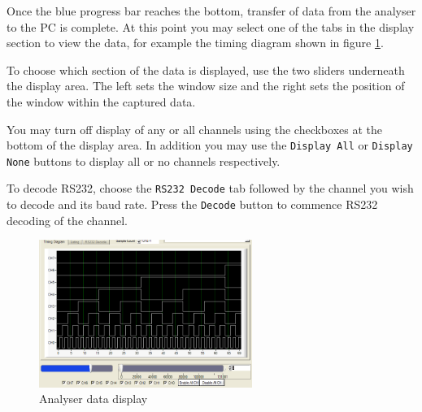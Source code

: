 \documentclass[11pt,twocolumn]{article}
\begin{document}
    Once the blue progress bar reaches the bottom, transfer of data from the
    analyser to the PC is complete. At this point you may select one of the
    tabs in the display section to view the data, for example the timing
    diagram shown in figure \ref{fig:ui-timing}.

    To choose which section of the data is displayed, use the two sliders 
    underneath the display area. The left sets the window size and the right
    sets the position of the window within the captured data.

    You may turn off display of any or all channels using the checkboxes at the
    bottom of the display area. In addition you may use the \texttt{Display
    All} or \texttt{Display None} buttons to display all or no channels
    respectively.

    To decode RS232, choose the \texttt{RS232 Decode} tab followed by the
    channel you wish to decode and its baud rate. Press the \texttt{Decode}
    button to commence RS232 decoding of the channel.

    \begin{figure}
    \centering
    \includegraphics[height=4.8cm]{ui-timing}
    \caption{Analyser data display}
    \label{fig:ui-timing}
    \end{figure}
	
\end{document}
